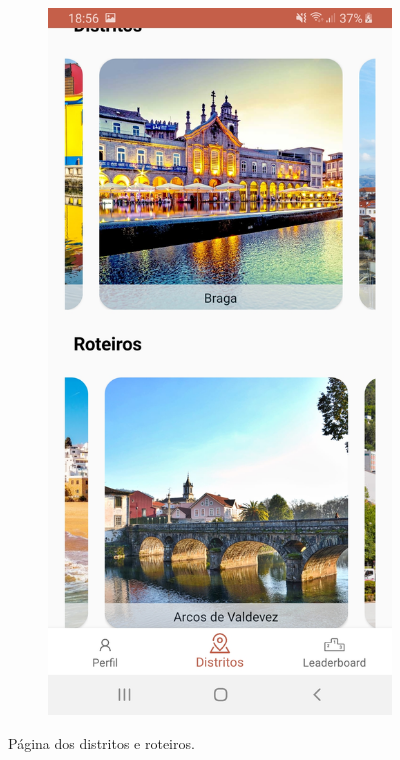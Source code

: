 \begin{figure}[H]
\begin{subfigure}{.5\textwidth}
        \includegraphics[width=0.9\linewidth]{images/distritos2.jpg}
    \end{subfigure}
    \caption{Página dos distritos e roteiros.}
\end{figure}